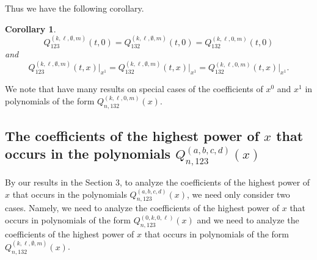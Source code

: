 \documentclass[
final,nomarks
]{dmtcs-episciences}
\newtheorem{corollary}{Corollary}
\newcommand{\Qmmx}[2]{Q_{132}^{(#1)}(#2)}
\newcommand{\Qmx}[2]{Q_{123}^{(#1)}(#2)}
\newcommand{\Qmmn}[2]{Q_{#2,132}^{(#1)}(x)}
\newcommand{\Qmn}[2]{Q_{#2,123}^{(#1)}(x)}
\begin{document}
Thus we have the following corollary.
\begin{corollary}\label{corollary:2}
\begin{equation}
\Qmx{k,\ell,\emptyset,m}{t,0}=\Qmmx{k,\ell,\emptyset,m}{t,0}=\Qmmx{k,\ell,0,m}{t,0}
\end{equation}
	and
\begin{equation}
\Qmx{k,\ell,\emptyset,m}{t,x}\big\vert_{x^1}=\Qmmx{k,\ell,\emptyset,m}{t,x}\big\vert_{x^1}=
\Qmmx{k,\ell,0,m}{t,x}\big\vert_{x^1}.
\end{equation}
\end{corollary}

We note that \cite{KRT1,KRT2,KRT3} have many results on special cases of the coefficients of \begin{math}x^0\end{math} and \begin{math}x^1\end{math} in polynomials of the form 
\begin{math}\Qmmn{k,\ell,0,m}{n}\end{math}.






\subsection{The coefficients of the highest power of \(x\) that occurs in the polynomials 
	\(\Qmn{a,b,c,d}{n}\)}


By our results in the Section \begin{math}3\end{math}, to analyze the coefficients of the highest power of \begin{math}x\end{math} that occurs in the polynomials \begin{math}\Qmn{a,b,c,d}{n}\end{math}, we need only consider two cases. Namely, 
we need to analyze the coefficients of the highest power of \begin{math}x\end{math} that occurs in 
polynomials of the form \begin{math}\Qmn{0,k,0,\ell}{n}\end{math} and we need to analyze 
the coefficients of the highest power of \begin{math}x\end{math} that occurs in 
polynomials of the form \begin{math}\Qmmn{k,\ell,\emptyset,m}{n}\end{math}. 
\end{document}
